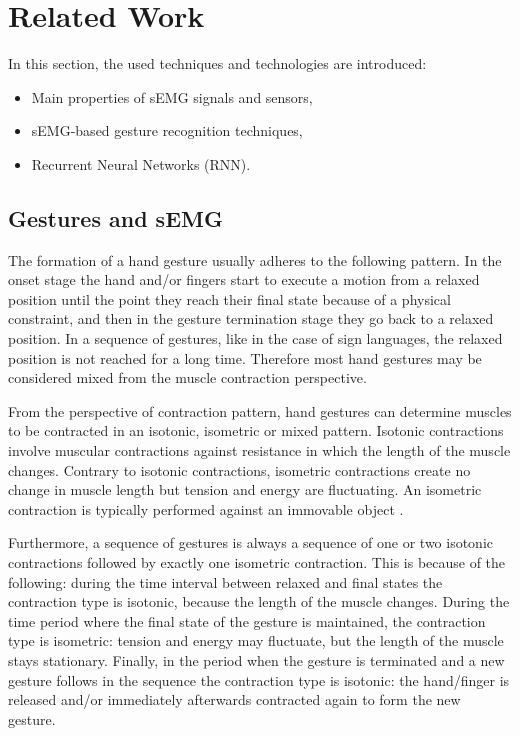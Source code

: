 \documentclass[conference]{IEEEtran}
\begin{document}
\section{Related Work} \label{sec:related_work}

In this section, the used techniques and technologies are introduced:
\begin{itemize}
	\item Main properties of sEMG signals and sensors,
	\item sEMG-based gesture recognition techniques,
	\item Recurrent Neural Networks (RNN).
\end{itemize} 

\subsection{Gestures and sEMG}

The formation of a hand gesture usually adheres to the following pattern. In the onset stage the hand and/or fingers start to execute a motion from a relaxed position until the point they reach their final state because of a physical constraint, and then in the gesture termination stage they go back to a relaxed position. In a sequence of gestures, like in the case of sign languages, the relaxed position is not reached for a long time. Therefore most hand gestures may be considered mixed from the muscle contraction perspective. 

From the perspective of contraction pattern, hand gestures can determine muscles to be contracted in an isotonic, isometric or mixed pattern. Isotonic contractions involve muscular contractions against resistance in which the length of the muscle changes. Contrary to isotonic contractions, isometric contractions create no change in muscle length but tension and energy are fluctuating. An isometric contraction is typically performed against an immovable object \cite{b17}.

Furthermore, a sequence of gestures is always a sequence of one or two isotonic contractions followed by exactly one isometric contraction. This is because of the following: during the time interval between relaxed and final states the contraction type is isotonic, because the length of the muscle changes. During the time period where the final state of the gesture is maintained, the contraction type is isometric: tension and energy may fluctuate, but the length of the muscle stays stationary. Finally, in the period when the gesture is terminated and a new gesture follows in the sequence the contraction type is isotonic: the hand/finger is released and/or immediately afterwards contracted again to form the new gesture.
\end{document}
